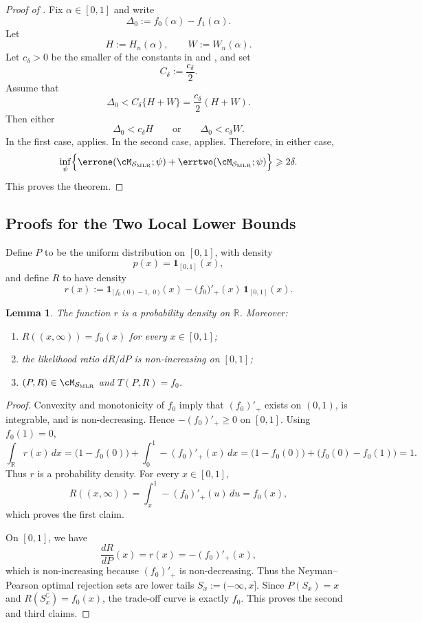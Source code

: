 \documentclass[english]{article}
\theoremstyle{plain}
\newtheorem{lemma}{Lemma}[section]
\theoremstyle{definition}
\newcommand{\Toff}[2]{T(#1,#2)}
\newcommand{\errsum}[1]{\errone(\cM_{\smlr};#1)+\errtwo(\cM_{\smlr};#1)}
\newcommand{\fnull}{f_0}
\newcommand{\falt}{f_1}
\newcommand{\smlr}{\mathcal{S}_{\mathrm{MLR}}}     %
\begin{document}
\begin{proof}[Proof of ]
Fix \(\alpha\in[0,1]\) and write
\[
\Delta_0:=\fnull(\alpha)-\falt(\alpha).
\]
Let
\[
H:=H_n(\alpha),
\qquad
W:=W_n(\alpha).
\]
Let \(c_\delta>0\) be the smaller of the constants in
 and
, and set
\[
C_\delta:=\frac{c_\delta}{2}.
\]
Assume that
\[
\Delta_0<C_\delta\{H+W\}
=
\frac{c_\delta}{2}(H+W).
\]
Then either
\[
\Delta_0<c_\delta H
\qquad\text{or}\qquad
\Delta_0<c_\delta W.
\]
In the first case,  applies.
In the second case,  applies.
Therefore, in either case,
\[
\inf_{\psi}
\Bigl\{
\errsum{\psi}
\Bigr\}
\geqslant 2\delta.
\]
This proves the theorem.
\end{proof}

\subsection{Proofs for the Two Local Lower Bounds}

Define \(P\) to be the uniform distribution on \([0,1]\), with density
\[
p(x)=\mathbf 1_{[0,1]}(x),
\]
and define \(R\) to have density
\[
r(x):=
\mathbf 1_{[\,\fnull(0)-1,\;0\,)}(x)
-\bigl(\fnull\bigr)'_+(x)\,\mathbf 1_{[0,1]}(x).
\]

\begin{lemma}\label{lem:base-pair}
The function \(r\) is a probability density on \(\mathbb R\). Moreover:
\begin{enumerate}
\item \(R((x,\infty))=\fnull(x)\) for every \(x\in[0,1]\);
\item the likelihood ratio \(dR/dP\) is non-increasing on \([0,1]\);
\item \((P,R)\in\cM_{\smlr}\) and \(\Toff{P}{R}=\fnull\).
\end{enumerate}
\end{lemma}

\begin{proof}
Convexity and monotonicity of \(\fnull\) imply that \((\fnull)'_+\) exists
on \((0,1)\), is integrable, and is non-decreasing. Hence
\(-(\fnull)'_+\geqslant0\) on \([0,1]\). Using \(\fnull(1)=0\),
\[
\int_{\mathbb R} r(x)\,dx
=
\bigl(1-\fnull(0)\bigr)
+
\int_0^1 -(\fnull)'_+(x)\,dx
=
\bigl(1-\fnull(0)\bigr)
+
\bigl(\fnull(0)-\fnull(1)\bigr)
=
1.
\]
Thus \(r\) is a probability density.  For every \(x\in[0,1]\),
\[
R((x,\infty))
=
\int_x^1 -(\fnull)'_+(u)\,du
=
\fnull(x),
\]
which proves the first claim.

On \([0,1]\), we have
\[
\frac{dR}{dP}(x)=r(x)=-(\fnull)'_+(x),
\]
which is non-increasing because \((\fnull)'_+\) is non-decreasing.  Thus
the Neyman--Pearson optimal rejection sets are lower tails
\(S_x:=(-\infty,x]\).  Since \(P(S_x)=x\) and
\(R(S_x^\complement)=\fnull(x)\), the trade-off curve is exactly
\(\fnull\).  This proves the second and third claims.
\end{proof}
\end{document}
